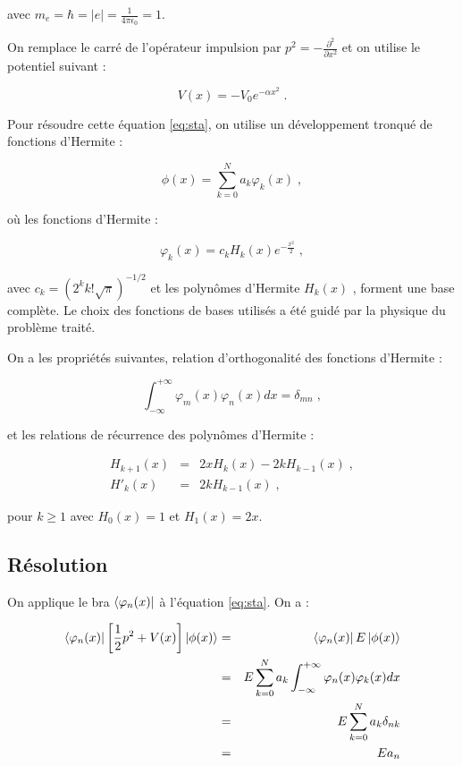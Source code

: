 \documentclass{report}
\begin{document}
avec $m_{e}=\hbar=\left|e\right|=\frac{1}{4\pi\epsilon_{0}}=1$.

On remplace le carré de l'opérateur impulsion par $p^{2}=-\frac{\partial^2}{\partial x^{2}}$ et on utilise le potentiel suivant :

\begin{equation}
V(x)= -V_{0}e^{-\alpha x^{2}}\;.
\end{equation}

Pour résoudre cette équation \eqref{eq:sta}, on utilise un développement tronqué de fonctions d'Hermite :

\begin{equation}\label{eq:varphi}
\phi(x)= \sum_{k=0}^N a_k \varphi_k(x)\;,
\end{equation}

où les fonctions d'Hermite :

\begin{equation}
\varphi_k(x)= c_{k} H_{k}(x)e^{-\frac{x^{2}}{2}}\;,
\end{equation}

avec $c_{k} =\left(2^{k}k!\sqrt{\pi}\right)^{-1/2}$ et les polynômes d'Hermite $H_{k}(x)$ , forment une base complète. Le choix des fonctions de bases utilisés a été guidé par la physique du problème traité.

On a les propriétés suivantes, relation d'orthogonalité des fonctions d'Hermite :

\begin{equation}\label{eq:ortho_phi}
\int_{-\infty}^{+\infty} \varphi_m(x) \varphi_n(x) dx = \delta_{mn}\;,
\end{equation}

et les relations de récurrence des polynômes d'Hermite :

\begin{eqnarray}\label{eq:recu}
H_{k+1}(x) &=& 2xH_k(x) - 2kH_{k-1}(x) \;,\\
H'_{k}(x) &=& 2k H_{k-1}(x)\;,\label{eq:recu2}
\end{eqnarray}

pour $k \geq 1$ avec $H_0 (x) = 1$ et $H_1 (x) = 2x$.

\subsection{Résolution}

On applique le bra $\bra{\varphi_n(x)}$ à l'équation \eqref{eq:sta}. On a :

\begin{eqnarray}
\bra{\varphi_n(x)}\left[\frac{1}{2}p^{2}+V(x)\right]\ket{\phi(x)} &=& \bra{\varphi_n(x)}E\ket{\phi(x)}\\
 &=& E \sum_{k=0}^N a_k \int_{-\infty}^{+\infty} \varphi_n(x)\varphi_k(x) dx\\
&=& E \sum_{k=0}^N a_k \delta_{nk}\\
&=& E a_n
\end{eqnarray} 
\end{document}
